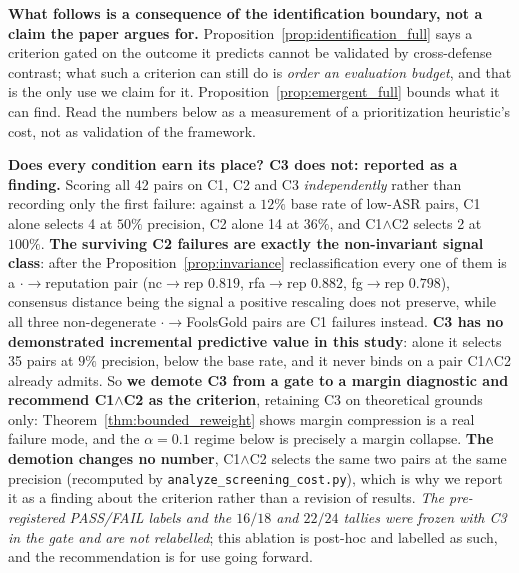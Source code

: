 \documentclass{article}
\begin{document}
\textbf{What follows is a consequence of the identification boundary, not a claim the paper argues for.} Proposition~\ref{prop:identification_full} says a criterion gated on the outcome it predicts cannot be validated by cross-defense contrast; what such a criterion can still do is \emph{order an evaluation budget}, and that is the only use we claim for it. Proposition~\ref{prop:emergent_full} bounds what it can find. Read the numbers below as a measurement of a prioritization heuristic's cost, not as validation of the framework.

\textbf{Does every condition earn its place? C3 does not: reported as a finding.} Scoring all 42 pairs on C1, C2 and C3 \emph{independently} rather than recording only the first failure: against a $12\%$ base rate of low-ASR pairs, C1 alone selects 4 at $50\%$ precision, C2 alone 14 at $36\%$, and C1$\wedge$C2 selects 2 at $100\%$. \textbf{The surviving C2 failures are exactly the non-invariant signal class}: after the Proposition~\ref{prop:invariance} reclassification every one of them is a $\cdot{\to}$reputation pair (nc$\to$rep $0.819$, rfa$\to$rep $0.882$, fg$\to$rep $0.798$), consensus distance being the signal a positive rescaling does not preserve, while all three non-degenerate $\cdot{\to}$FoolsGold pairs are C1 failures instead. \textbf{C3 has no demonstrated incremental predictive value in this study}: alone it selects 35 pairs at $9\%$ precision, below the base rate, and it never binds on a pair C1$\wedge$C2 already admits. So \textbf{we demote C3 from a gate to a margin diagnostic and recommend C1$\wedge$C2 as the criterion}, retaining C3 on theoretical grounds only: Theorem~\ref{thm:bounded_reweight} shows margin compression is a real failure mode, and the $\alpha{=}0.1$ regime below is precisely a margin collapse. \textbf{The demotion changes no number}, C1$\wedge$C2 selects the same two pairs at the same precision (recomputed by \texttt{analyze\_screening\_cost.py}), which is why we report it as a finding about the criterion rather than a revision of results. \emph{The pre-registered PASS/FAIL labels and the $16/18$ and $22/24$ tallies were frozen with C3 in the gate and are not relabelled}; this ablation is post-hoc and labelled as such, and the recommendation is for use going forward.
\end{document}
